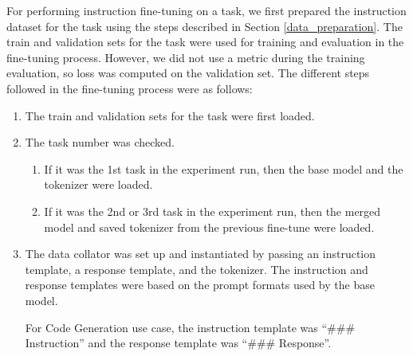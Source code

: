 For performing instruction fine-tuning on a task, we first prepared the instruction dataset for the task using the steps described in Section \ref{data_preparation}. The train and validation sets for the task were used for training and evaluation in the fine-tuning process. However, we did not use a metric during the training evaluation, so loss was computed on the validation set. 
The different steps followed in the fine-tuning process were as follows:
\begin{enumerate}
\item The train and validation sets for the task were first loaded.
\item The task number was checked.
\begin{enumerate} [label*=\arabic*.]
\item If it was the 1st task in the experiment run, then the base model and the tokenizer were loaded.
\item If it was the 2nd or 3rd task in the experiment run, then the merged model and saved tokenizer from the previous fine-tune were loaded.
\end{enumerate}
\item The data collator was set up and instantiated by passing an instruction template, a response template, and the tokenizer. The instruction and response templates were based on the prompt formats used by the base model.

For Code Generation use case, the instruction template was “\#\#\# Instruction” and the response template was “\#\#\# Response”.


\end{enumerate}

